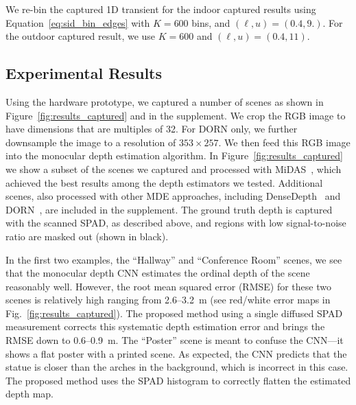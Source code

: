 We re-bin the captured 1D transient for the indoor captured results 
using Equation~\ref{eq:sid_bin_edges} with $K = 600$ bins, and $(\ell, u)=(0.4, 9.)$.
For the outdoor captured result, we use $K=600$ and $(\ell, u)=(0.4, 11)$. 
%

\subsection{Experimental Results}

Using the hardware prototype, we captured a number of scenes as shown in
Figure~\ref{fig:results_captured} and in the supplement. We crop the RGB image
to have dimensions that are multiples of 32. For DORN only, we further
downsample the image to a resolution of $353 \times 257$. We then feed this RGB
image into the monocular depth estimation algorithm. In Figure~\ref{fig:results_captured} we show a subset of the scenes we captured and processed with MiDAS~\cite{Lasinger:2019}, which achieved the best results among the depth estimators we tested. Additional scenes, also processed with other MDE approaches, including DenseDepth~\cite{Alhashim2018} and DORN~\cite{Fu2018}, are included in the supplement. The ground truth depth is captured with the scanned SPAD, as described above, and regions with low signal-to-noise ratio are masked out (shown in black).

In the first two examples, the ``Hallway'' and ``Conference Room'' scenes, we see that the monocular depth CNN estimates the ordinal depth of the scene reasonably well. However, the root mean squared error (RMSE) for these two scenes is relatively high ranging from 2.6--3.2~m (see red/white error maps in Fig.~\ref{fig:results_captured}). The proposed method using a single diffused SPAD measurement corrects this systematic depth estimation error and brings the RMSE down to 0.6--0.9~m. The ``Poster'' scene is meant to confuse the CNN---it shows a flat poster with a printed scene. As expected, the CNN predicts that the statue is closer than the arches in the background, which is incorrect in this case. The proposed method uses the SPAD histogram to correctly flatten the estimated depth map. 

